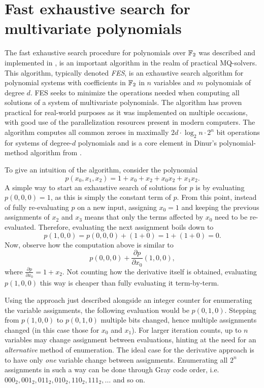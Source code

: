 \section{Fast exhaustive search for multivariate polynomials} \label{sec:prereq:fes}
The fast exhaustive search procedure for polynomials over $\mathbb{F}_2$ was described and implemented in \cite{ches-2010-23990, cryptoeprint:2013/436, tungchoumasters},
is an important algorithm in the realm of practical MQ-solvers. This algorithm, typically denoted \textit{FES}, is an exhaustive search algorithm for polynomial systems with coefficients in $\mathbb{F}_2$ in $n$ variables and $m$ polynomials of degree $d$. FES seeks to minimize the operations needed when computing all solutions of a system of multivariate polynomials. The algorithm has proven practical for real-world purposes as it was implemented on multiple occasions, with good use of the parallelization resources present in modern computers. The algorithm computes all common zeroes in maximally $2d\cdot \log_2n \cdot 2^n$ bit operations
for systems of degree-$d$ polynomials and is a core element in Dinur's polynomial-method algorithm from \cite{eurocrypt-2021-30841}.

To give an intuition of the algorithm, consider the polynomial
$$
    p(x_0, x_1, x_2) = 1 + x_0 + x_2 + x_0x_2 + x_1x_2.
$$
A simple way to start an exhaustive search of solutions for $p$ is by evaluating $p(0, 0, 0) = 1$, as this is simply the constant term of $p$. From this point, instead of fully re-evaluating $p$ on a new input, assigning $x_0 = 1$ and keeping the previous assignments of $x_2$ and $x_3$ means that only the terms affected by $x_0$ need to be re-evaluated. Therefore, evaluating the next assignment boils down to 
$$
    p(1, 0, 0) = p(0, 0, 0) + (1 + 0) = 1 + (1 + 0) = 0.
$$
Now, observe how the computation above is similar to 
$$
    p(0, 0, 0) + \frac{\partial p}{\partial x_0}(1, 0, 0),
$$
where $\frac{\partial p}{\partial x_0} = 1 + x_2$. Not counting how the derivative itself is obtained, evaluating $p(1, 0, 0)$ this way is cheaper than fully evaluating it term-by-term.

Using the approach just described alongside an integer counter for enumerating the variable assignments, the following evaluation would be $p(0,1,0)$. Stepping from $p(1,0,0)$ to $p(0,1,0)$ multiple bits changed, hence multiple assignments changed (in this case those for $x_0$ and $x_1$). For larger iteration counts, up to $n$ variables may change assignment between evaluations, hinting at the need for an \textit{alternative} method of enumeration. The ideal case for the derivative approach is to have only \textit{one} variable change between assignments. Enumerating all $2^n$ assignments in such a way can be done through Gray code order, i.e. $000_2, 001_2, 011_2, 010_2, 110_2, 111_2, \dots$ and so on.

